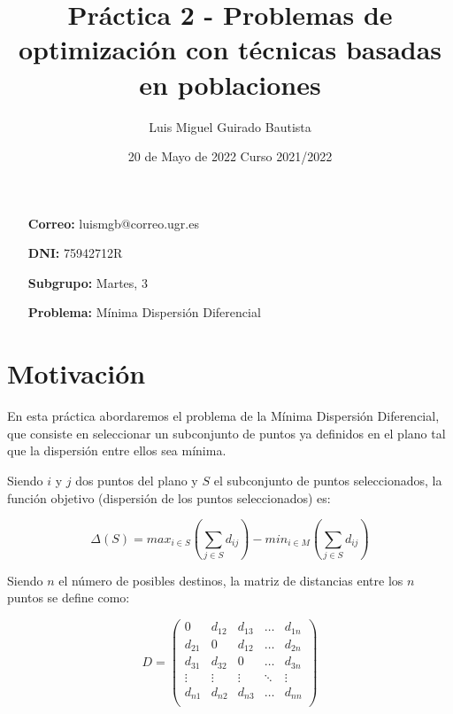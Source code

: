 \documentclass{article}
\title{Práctica 2 - Problemas de optimización con técnicas basadas en poblaciones}
\author{Luis Miguel Guirado Bautista}
\date{20 de Mayo de 2022 \qquad Curso 2021/2022}
\begin{document}
    \begin{titlepage}
        \maketitle
        \thispagestyle{empty}
        \begin{enumerate}
            \item[\textbf{Correo:}]luismgb@correo.ugr.es
            \item[\textbf{DNI:}]75942712R
            \item[\textbf{Subgrupo:}]Martes, 3
            \item[\textbf{Problema:}]Mínima Dispersión Diferencial 
        \end{enumerate}
    \end{titlepage}

    \pagebreak

    \tableofcontents

    \pagebreak
    \rfoot{\thepage}
    \section{Motivación}

    En esta práctica abordaremos el problema de la Mínima Dispersión Diferencial, que
    consiste en seleccionar un subconjunto de puntos ya definidos en el plano tal que
    la dispersión entre ellos sea mínima.

    Siendo $i$ y $j$ dos puntos del plano y $S$ el subconjunto de puntos
    seleccionados, la función objetivo (dispersión de los puntos seleccionados) es:

    \begin{equation*}
        \Delta(S) = max_{i \in S}(\sum_{j \in S}{d_{ij}}) - min_{i \in M}(\sum_{j \in S}{d_{ij}})
    \end{equation*}

    Siendo $n$ el número de posibles destinos, la matriz de distancias entre los $n$ puntos
    se define como:

    \begin{equation*}
        D =
        \begin{pmatrix}
            0 & d_{12} & d_{13} & \dots & d_{1n} \\
            d_{21} & 0 & d_{12} & \dots & d_{2n} \\
            d_{31} & d_{32} & 0 & \dots & d_{3n} \\
            \vdots & \vdots & \vdots & \ddots & \vdots \\
            d_{n1} & d_{n2} & d_{n3} & \dots & d_{nn} \\
        \end{pmatrix}
    \end{equation*}
\end{document}
